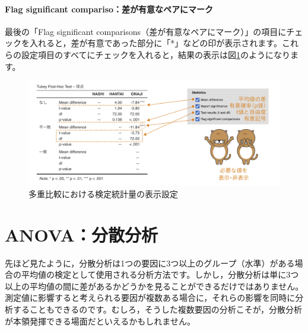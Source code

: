 \documentclass[
  12pt,
  a5jpaper,
  lualatex, ja=standard]{bxjsbook}
\begin{document}
\hypertarget{flag-significant-comparisoux5deeux304cux6709ux610fux306aux30daux30a2ux306bux30deux30fcux30af}{%
\paragraph*{Flag significant compariso：差が有意なペアにマーク}\label{flag-significant-comparisoux5deeux304cux6709ux610fux306aux30daux30a2ux306bux30deux30fcux30af}}

最後の「Flag significant comparisons（差が有意なペアにマーク）」の項目にチェックを入れると，差が有意であった部分に「*」などの印が表示されます。これらの設定項目のすべてにチェックを入れると，結果の表示は図\ref{fig:ANOVA-oneway-posthoc-statistics}のようになります。

\begin{figure}[!ht]

{\centering \includegraphics[width=1\linewidth]{images/ANOVA/oneway-posthoc-statistics} 

}

\caption{多重比較における検定統計量の表示設定}\label{fig:ANOVA-oneway-posthoc-statistics}
\end{figure}

\hypertarget{sec:ANOVA-anova}{%
\section{ANOVA：分散分析}\label{sec:ANOVA-anova}}

先ほど見たように，分散分析は1つの要因に3つ以上のグループ（水準）がある場合の平均値の検定として使用される分析方法です。しかし，分散分析は単に3つ以上の平均値の間に差があるかどうかを見ることができるだけではありません。測定値に影響すると考えられる要因が複数ある場合に，それらの影響を同時に分析することもできるのです。むしろ，そうした複数要因の分析こそが，分散分析が本領発揮できる場面だといえるかもしれません。
\end{document}
